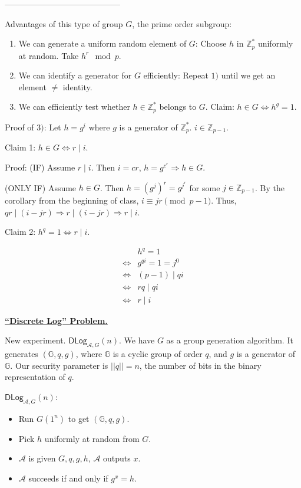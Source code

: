 \documentclass[12pt]{article}
\newcommand{\Z}{\mathbb{Z}}
\newcommand{\G}{\mathbb{G}}
\newcommand{\AAA}{\mathcal{A}}
\newcommand{\ExptDLogArgs}[2]{\mathsf{DLog}_{#1,#2}}
\newcommand{\ExptDLog}{\ExptDLogArgs{\AAA}{G}}
\begin{document}
------------------------------------------

Advantages of this type of group $G$, the prime order subgroup:\begin{enumerate}

\item We can generate a uniform random element of $G$: Choose $h$ in $\Z_p^*$ uniformly at random. Take $h^r\mod{p}$.

\item We can identify a generator for $G$ efficiently: Repeat $1)$ until we get an element $\neq$ identity.

\item We can efficiently test whether $h\in\Z_p^*$ belongs to $G$. Claim: $h\in G\Leftrightarrow h^g=1$.

\end{enumerate}

Proof of $3)$: Let $h=g^i$ where $g$ is a generator of $\Z_p^*$. $i\in\Z_{p-1}$.

Claim 1: $h\in G\Leftrightarrow r\mid i$.

Proof: (IF) Assume $r\mid i$. Then $i=cr$, $h=g^{c^r}\Rightarrow h\in G$.

(ONLY IF) Assume $h\in G$. Then $h=(g^j)^r=g^{j^r}$ for some $j\in\Z_{p-1}$. By the corollary from the beginning of class, $i\equiv jr\pmod{p-1}$. Thus, $qr\mid(i-jr)\Rightarrow r\mid(i-jr)\Rightarrow r\mid i$.

Claim 2: $h^q=1\iff r\mid i$.

\begin{align*}
&h^q=1\\
\iff&g^{qi}=1=j^0\\
\iff&(p-1)\mid qi\\
\iff&rq\mid qi\\
\iff&r\mid i
\end{align*}

\underline{\bf ``Discrete Log'' Problem.}

New experiment. $\ExptDLog(n)$. We have $G$ as a group generation algorithm. It generates $(\G,q,g)$, where $\G$ is a cyclic group of order $q$, and $g$ is a generator of $\G$. Our security parameter is $||q||=n$, the number of bits in the binary representation of $q$.

$\ExptDLog(n)$:\begin{itemize}

\item Run $G(1^n)$ to get $(\G,q,g)$.

\item Pick $h$ uniformly at random from $G$.

\item $\AAA$ is given $G,q,g,h$, $\AAA$ outputs $x$.

\item $\AAA$ succeeds if and only if $g^x=h$.

\end{itemize}
\end{document}
